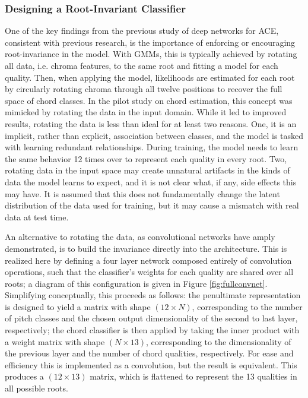 \subsubsection{Designing a Root-Invariant Classifier}
\label{subsubsec:root_invariance}
One of the key findings from the previous study of deep networks for ACE, consistent with previous research, is the importance of enforcing or encouraging root-invariance in the model.
With GMMs, this is typically achieved by rotating all data, i.e. chroma features, to the same root and fitting a model for each quality.
Then, when applying the model, likelihoods are estimated for each root by circularly rotating chroma through all twelve positions to recover the full space of chord classes.
In the pilot study on chord estimation, this concept was mimicked by rotating the data in the input domain.
While it led to improved results, rotating the data is less than ideal for at least two reasons.
One, it is an implicit, rather than explicit, association between classes, and the model is tasked with learning redundant relationships.
During training, the model needs to learn the same behavior 12 times over to represent each quality in every root.
Two, rotating data in the input space may create unnatural artifacts in the kinds of data the model learns to expect, and it is not clear what, if any, side effects this may have.
It is assumed that this does not fundamentally change the latent distribution of the data used for training, but it may cause a mismatch with real data at test time.

An alternative to rotating the data, as convolutional networks have amply demonstrated, is to build the invariance directly into the architecture.
This is realized here by defining a four layer network composed entirely of convolution operations, such that the classifier's weights for each quality are shared over all roots; a diagram of this configuration is given in Figure \ref{fig:fullconvnet}.
Simplifying conceptually, this proceeds as follows: the penultimate representation is designed to yield a matrix with shape $(12 \times N)$, corresponding to the number of pitch classes and the chosen output dimensionality of the second to last layer, respectively; the chord classifier is then applied by taking the inner product with a weight matrix with shape $(N \times 13)$, corresponding to the dimensionality of the previous layer and the number of chord qualities, respectively.
For ease and efficiency this is implemented as a convolution, but the result is equivalent.
This produces a $(12 \times 13)$ matrix, which is flattened to represent the 13 qualities in all possible roots.

